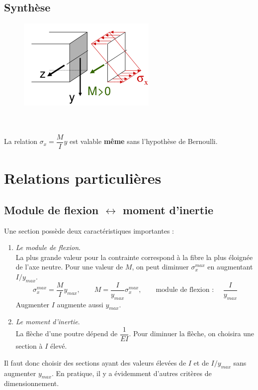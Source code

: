 	\subsection{Synthèse}
\vspace{-1cm}
	\begin{figure}
	\vspace{-2mm}
	\includegraphics[scale=0.45]{ch4/image3.png}
	\end{figure}\ \\
	
	\ \\
	La relation $\sigma_x=\dfrac{M}{I}y$ est valable \textbf{même} sans 
	l'hypothèse de Bernoulli.
	
\section{Relations particulières}
	\subsection{Module de flexion $\leftrightarrow$ moment d’inertie}
	Une section possède deux caractéristiques importantes : 
	\begin{enumerate}
	\item \textit{Le module de flexion}.\\
	La plus grande valeur pour la contrainte correspond à la fibre la plus 
	éloignée de l'axe neutre. Pour une valeur de $M$, on peut 
	diminuer $\sigma_x^{max}$ en augmentant $I/y_{max}$.
	\begin{equation}
	\sigma_x^{max} = \dfrac{M}{I}y_{max},\qquad M=\dfrac{I}{y_{max}}\sigma_x^{
	max},\qquad \text{module de flexion : }\quad \dfrac{I}{y_{max}}
	\end{equation}
	\danger Augmenter $I$ augmente aussi $y_{max}$.
	
	\item \textit{Le moment d'inertie}.\\
	La flèche d'une poutre dépend de $\dfrac{1}{EI}$. Pour diminuer la flèche, 
	on choisira une section à $I$ élevé.
	\end{enumerate}
	Il faut donc choisir des sections ayant des valeurs élevées de $I$ et 
	de $I/y_{max}$ sans augmenter $y_{max}$. En pratique, il y a évidemment 
	d'autres critères de dimensionnement.
	
